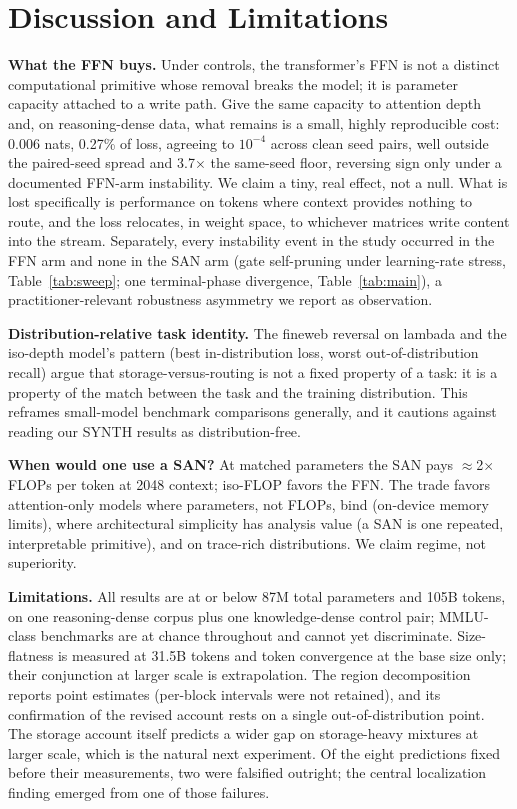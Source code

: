 \documentclass[letterpaper]{article} %
\begin{document}
\section{Discussion and Limitations}

\textbf{What the FFN buys.} Under controls, the transformer's FFN is not
a distinct computational primitive whose removal breaks the model; it is
parameter capacity attached to a write path. Give the same capacity to
attention depth and, on reasoning-dense data, what remains is a small,
highly reproducible cost: 0.006 nats, 0.27\% of loss, agreeing to
$10^{-4}$ across clean seed pairs, well outside the paired-seed spread
and 3.7$\times$ the same-seed floor, reversing sign only under a
documented FFN-arm instability. We claim a tiny, real effect, not a null.
What is lost specifically is performance on tokens where context provides
nothing to route, and the loss relocates, in weight space, to whichever
matrices write content into the stream. Separately, every instability
event in the study occurred in the FFN arm and none in the SAN arm
(gate self-pruning under learning-rate stress, Table~\ref{tab:sweep};
one terminal-phase divergence, Table~\ref{tab:main}), a
practitioner-relevant robustness asymmetry
we report as observation.

\textbf{Distribution-relative task identity.} The fineweb reversal on
lambada and the iso-depth model's pattern (best in-distribution loss,
worst out-of-distribution recall) argue that storage-versus-routing is
not a fixed property of a task: it is a property of the match between the
task and the training distribution. This reframes small-model benchmark
comparisons generally, and it cautions against reading our SYNTH results
as distribution-free.

\textbf{When would one use a SAN?} At matched parameters the SAN pays
$\approx$2$\times$ FLOPs per token at 2048 context; iso-FLOP favors the
FFN. The trade favors attention-only models where parameters, not FLOPs,
bind (on-device memory limits), where architectural simplicity has
analysis value (a SAN is one repeated, interpretable primitive), and on
trace-rich distributions. We claim regime, not superiority.

\textbf{Limitations.} All results are at or below 87M total parameters
and 105B tokens, on one reasoning-dense corpus plus one knowledge-dense
control pair; MMLU-class benchmarks are at chance throughout and cannot
yet discriminate. Size-flatness is measured at 31.5B tokens and token
convergence at the base size only; their conjunction at larger scale is
extrapolation. The region decomposition reports point estimates
(per-block intervals were not retained), and its confirmation of the
revised account rests on a single out-of-distribution point. The storage account itself predicts a wider gap on
storage-heavy mixtures at larger scale, which is the natural next
experiment. Of the eight predictions fixed before their measurements, two
were falsified outright; the central localization finding emerged from
one of those failures.


\end{document}

